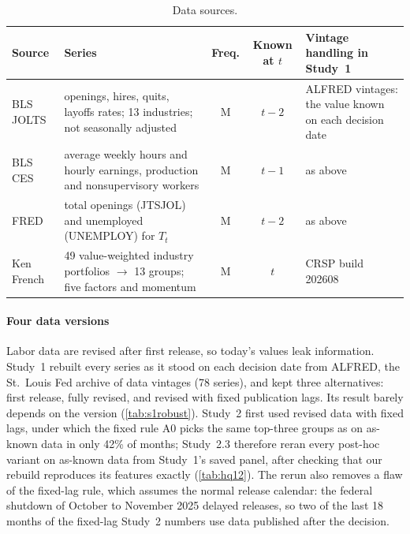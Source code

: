 \begin{table}[!htbp]
\centering\small
\caption{Data sources. \hfill\tagc}
\label{tab:data}
\begin{tabularx}{\textwidth}{@{}l Y c c Y@{}}
\toprule
Source & Series & Freq. & Known at $t$ & Vintage handling in Study~1 \\
\midrule
BLS JOLTS & openings, hires, quits, layoffs rates; 13 industries; not seasonally adjusted & M & $t-2$ & ALFRED vintages: the value known on each decision date \\
BLS CES   & average weekly hours and hourly earnings, production and nonsupervisory workers & M & $t-1$ & as above \\
FRED      & total openings (JTSJOL) and unemployed (UNEMPLOY) for $T_t$ & M & $t-2$ & as above \\
Ken French & 49 value-weighted industry portfolios $\to$ 13 groups; five factors and momentum & M & $t$ & CRSP build 202608 \\
\bottomrule
\end{tabularx}
\end{table}

\paragraph{Four data versions} Labor data are revised after first release, so today's values leak information. Study~1 rebuilt every series as it stood on each decision date from ALFRED, the St.\ Louis Fed archive of data vintages (78 series), %
and kept three alternatives: first release, fully revised, and revised with fixed publication lags. Its result barely depends on the version (\cref{tab:s1robust}). Study~2 first used revised data with fixed lags, under which the fixed rule A0 picks the same top-three groups as on as-known data in only 42\% of months; %
Study~2.3 therefore reran every post-hoc variant on as-known data from Study~1's saved panel, after checking that our rebuild reproduces its features exactly (\cref{tab:hq12}). %
The rerun also removes a flaw of the fixed-lag rule, which assumes the normal release calendar: the federal shutdown of October to November 2025 delayed releases, so two of the last 18 months of the fixed-lag Study~2 numbers use data published after the decision. %

